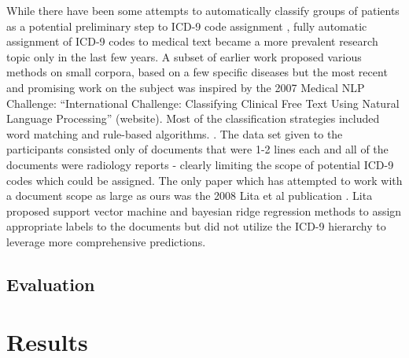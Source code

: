 \documentclass{article}
\begin{document}
While there have been some attempts to automatically classify groups
of patients as a potential preliminary step to ICD-9 code assignment
\citep{Ruch2008,FreitasJunior2006,RibeiroNeto2001,Brown2006}, fully
automatic assignment of ICD-9 codes to medical text became a more
prevalent research topic only in the last few years. A subset of earlier
work proposed various methods on small corpora, based on a few specific
diseases \citep{Rao2003} but the most recent and promising work on
the subject was inspired by the 2007 Medical NLP Challenge: \textquotedblleft{}International
Challenge: Classifying Clinical Free Text Using Natural Language Processing\textquotedblright{}
(website). Most of the classification strategies included word matching
and rule-based algorithms. \citep{Goldstein2007,Crammer2007,Farkas2008}.
The data set given to the participants consisted only of documents
that were 1-2 lines each and all of the documents were radiology reports
- clearly limiting the scope of potential ICD-9 codes which could
be assigned. The only paper which has attempted to work with a document
scope as large as ours was the 2008 Lita et al publication \citep{Lita2008}.
Lita proposed support vector machine and bayesian ridge regression
methods to assign appropriate labels to the documents but did not
utilize the ICD-9 hierarchy to leverage more comprehensive predictions.

\subsection{Evaluation}

\section{Results}
\label{sec:results}
\end{document}
